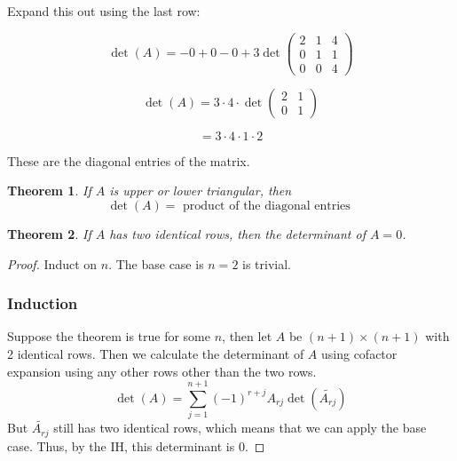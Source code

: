 \documentclass{article}
\newtheorem{theorem}{Theorem}[section]
\newtheorem{one minute paper}[theorem]{One Minute Paper}
\begin{document}
Expand this out using the last row:

\begin{equation}
    \det(A) = - 0 + 0 - 0 + 3\det\begin{pmatrix}
        2 & 1 & 4 \\
        0 & 1 & 1 \\
        0 & 0 & 4
    \end{pmatrix}
\end{equation}

\begin{equation}
    \det(A) = 3 \cdot 4 \cdot \det \begin{pmatrix}
        2 & 1 \\
        0 & 1
    \end{pmatrix}
\end{equation}

\begin{equation}
    = 3 \cdot 4 \cdot 1 \cdot 2
\end{equation}

These are the diagonal entries of the matrix. 

\begin{theorem}
    If $A$ is upper or lower triangular, then 
    \begin{equation}
        \det(A) = \text{ product of the diagonal entries }
    \end{equation}
\end{theorem}

\begin{theorem}
    If $A$ has two identical rows, then the determinant of $A = 0$. 
\end{theorem}

\begin{proof}
    Induct on $n$. The base case is $n = 2$ is trivial. 
    \subsubsection*{Induction}
    Suppose the theorem is true for some $n$, then let $A$ be $(n + 1) \times (n + 1)$ with 2 identical rows. Then we calculate the determinant of $A$ using cofactor 
    expansion using any other rows other than the two rows. 
    \begin{equation}
        \det(A) = \sum_{j = 1}^{n + 1}(-1)^{r + j}A_{rj}\det(\tilde{A_{rj}})
    \end{equation}
    But $\tilde{A_{rj}}$ still has two identical rows, which means that we can apply the base case. Thus, by the IH, this determinant is $0$. 
\end{proof}
\end{document}
